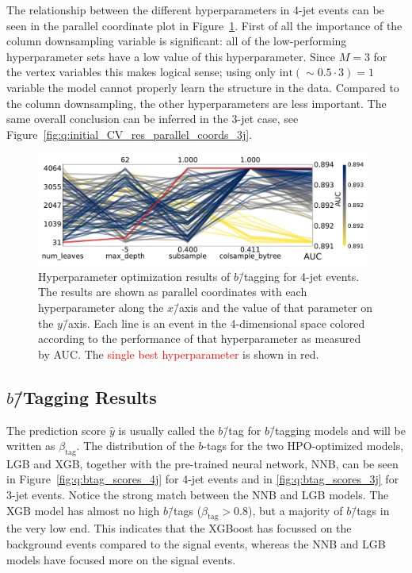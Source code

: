 The relationship between the different hyperparameters in 4-jet events can be seen in the parallel coordinate plot in Figure~\ref{fig:q:initial_CV_res_parallel_coords_4j}. First of all the importance of the column downsampling  variable is significant: all of the low-performing hyperparameter sets have a low value of this hyperparameter. Since $M=3$ for the vertex variables this makes logical sense; using only $\mathrm{int}(\sim 0.5 \cdot 3) = 1$ variable the model cannot properly learn the structure in the data. Compared to the column downsampling, the other hyperparameters are less important. The same overall conclusion can be inferred in the 3-jet case, see Figure~\ref{fig:q:initial_CV_res_parallel_coords_3j}.

\begin{figure}
  \includegraphics[width=0.98\textwidth, trim=0 0 0 0, clip]{figures/quarks/CV_viz-njet=4-name=lf_lgb_down_sample=1.00-ML_vars=vertex-selection=b-ejet_min=4-n_iter_RS_lgb=99-n_iter_RS_xgb=9-cdot_cut=0.90-version=19.pdf}
  \caption[Parallel Plot of HPO Results for 4-Jet $b$\=/Tagging]
          {Hyperparameter optimization results of $b$\=/tagging for 4-jet events. The results are shown as parallel coordinates with each hyperparameter along the $x$\=/axis and the value of that parameter on the $y$\=/axis. Each line is an event in the 4-dimensional space colored according to the performance of that hyperparameter as measured by AUC. The \textcolor{red}{single best hyperparameter} is shown in red. 
          } 
  \label{fig:q:initial_CV_res_parallel_coords_4j}
\end{figure}

\subsection{$b$\=/Tagging Results}

The prediction score $\hat{y}$ is usually called the $b$\=/tag for $b$\=/tagging models and will be written as $\beta_\mathrm{tag}$. The distribution of the $b$-tags for the two HPO-optimized models, LGB and XGB, together with the pre-trained neural network, NNB, can be seen in Figure~\ref{fig:q:btag_scores_4j} for 4-jet events and in \ref{fig:q:btag_scores_3j} for 3-jet events. Notice the strong match between the NNB and LGB models. The XGB model has almost no high $b$\=/tags ($\beta_\mathrm{tag} > 0.8$), but a majority of $b$\=/tags in the very low end. This indicates that the XGBoost has focussed on the background events compared to the signal events, whereas the NNB and LGB models have focused more on the signal events. 

